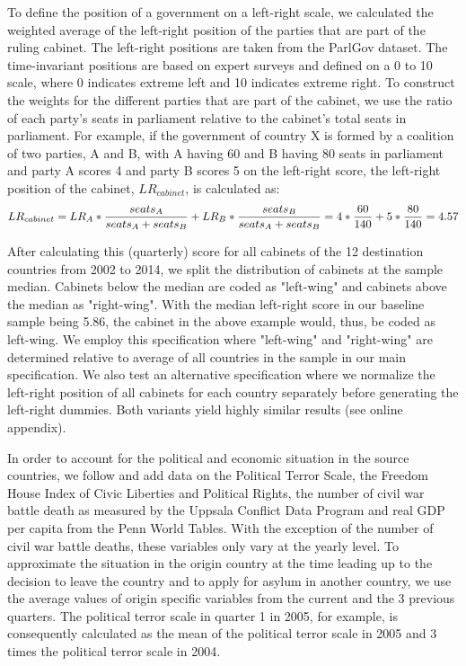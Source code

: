 \documentclass[a4paper,12pt]{article}
\begin{document}
To define the position of a government on a left-right scale, we calculated the weighted average of the left-right position of the parties that are part of the ruling cabinet. The left-right positions are taken from the ParlGov dataset. The time-invariant positions are based on expert surveys and defined on a 0 to 10 scale, where 0 indicates extreme left and 10 indicates extreme right. To construct the weights for the different parties that are part of the cabinet, we use the ratio of each party's seats in parliament relative to the cabinet's total seats in parliament. For example, if the government of country X is formed by a coalition of two parties, A and B, with A having 60 and B having 80 seats in parliament and party A scores 4 and party B scores 5 on the left-right score, the left-right position of the cabinet, $LR_{cabinet}$, is calculated as: 
\begin{equation*}
\tiny
LR_{cabinet} = LR_{A} * \frac{seats_{A}}{seats_{A} + seats_{B}} +LR_{B} * \frac{seats_{B}}{seats_{A} + seats_{B}} = 4*\frac{60}{140} +5*\frac{80}{140} = 4.57
\end{equation*}

After calculating this (quarterly) score for all cabinets of the 12 destination countries from 2002 to 2014, we split the distribution of cabinets at the sample median. Cabinets below the median are coded as "left-wing" and cabinets above the median as "right-wing". With the median left-right score in our baseline sample being 5.86, the cabinet in the above example would, thus, be coded as left-wing. We employ this specification where "left-wing" and "right-wing" are determined relative to average of all countries in the sample in our main specification. We also test an alternative specification where we normalize the left-right position of all cabinets for each country separately before generating the left-right dummies. Both variants yield highly similar results (see online appendix). 

In order to account for the political and economic situation in the source countries, we follow \cite{hatton2016} and add data on the Political Terror Scale, the Freedom House Index of Civic Liberties and Political Rights, the number of civil war battle death as measured by the Uppsala Conflict Data Program  and real GDP per capita from the Penn World Tables.  With the exception of the number of civil war battle deaths, these variables only vary at the yearly level. To approximate the situation in the origin country at the time leading up to the decision to leave the country and to apply for asylum in another country, we use the average values of origin specific variables from the current and the 3 previous quarters. The political terror scale in quarter 1 in 2005, for example, is consequently calculated as the mean of the political terror scale in 2005 and 3 times the political terror scale in 2004. 
\end{document}
